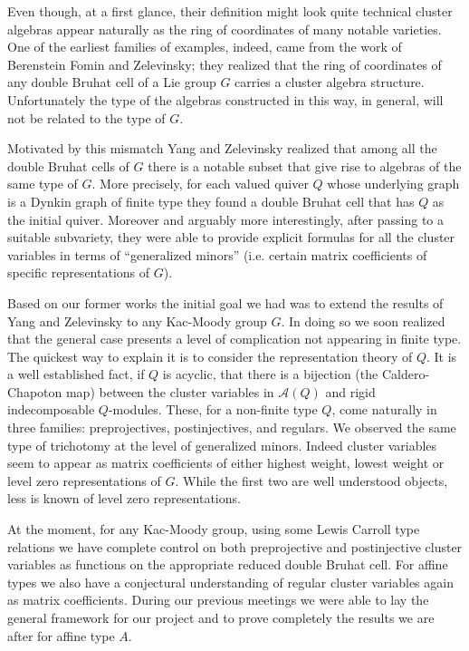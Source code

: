 \documentclass{amsart}
\begin{document}
  Even though, at a first glance, their definition might look quite technical cluster algebras appear naturally as the ring of coordinates of many notable varieties. 
  One of the earliest families of examples, indeed, came from the work of Berenstein Fomin and Zelevinsky; they realized that the ring of coordinates of any double Bruhat cell of a Lie group $G$ carries a cluster algebra structure. 
  Unfortunately the type of the algebras constructed in this way, in general, will not be related to the type of $G$. 

  Motivated by this mismatch Yang and Zelevinsky realized that among all the double Bruhat cells of $G$ there is a notable subset that give rise to algebras of the same type of $G$. 
  More precisely, for each valued quiver $Q$ whose underlying graph is a Dynkin graph of finite type they found a double Bruhat cell that has $Q$ as the initial quiver. 
  Moreover and arguably more interestingly, after passing to a suitable subvariety, they were able to provide explicit formulas for all the cluster variables in terms of ``generalized minors'' (i.e. certain matrix coefficients of specific representations of $G$).

  Based on our former works the initial goal we had was to extend the results of Yang and Zelevinsky to any Kac-Moody group $G$. 
  In doing so we soon realized that the general case presents a level of complication not appearing in finite type.
  The quickest way to explain it is to consider the representation theory of $Q$.
  It is a well established fact, if $Q$ is acyclic, that there is a bijection (the Caldero-Chapoton map) between the cluster variables in $\mathcal{A}(Q)$ and rigid indecomposable $Q$-modules. 
  These, for a non-finite type $Q$, come naturally in three families: preprojectives, postinjectives, and regulars.
  We observed the same type of trichotomy at the level of generalized minors. 
  Indeed cluster variables seem to appear as matrix coefficients of either highest weight, lowest weight or level zero representations of $G$.  
  While the first two are well understood objects, less is known of level zero representations.
  
  At the moment, for any Kac-Moody group, using some Lewis Carroll type relations we have complete control on both preprojective and  postinjective cluster variables as functions on the appropriate reduced double Bruhat cell.
  For affine types we also have a conjectural understanding of regular cluster variables again as matrix coefficients. 
  During our previous meetings we were able to lay the general framework for our project and to prove completely the results we are after for affine type $A$. 
\end{document}
